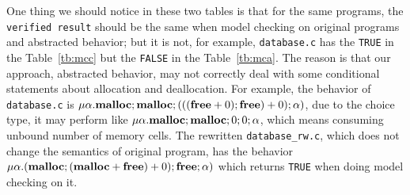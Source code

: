 One thing we should notice in these two tables is that for the same
programs, the \texttt{verified result} should be the same when model
checking on original programs and abstracted behavior; but it is not,
for example, \texttt{database.c} has the \texttt{TRUE} in the
Table~\ref{tb:mcc} but the \texttt{FALSE} in the
Table~\ref{tb:mca}. The reason is that our approach, abstracted
behavior, may not correctly deal with some conditional statements
about allocation and deallocation. For example, the behavior of
\texttt{database.c} is $\mu\alpha.\mathbf{malloc};\mathbf{malloc};(((\mathbf{free} + 0);\mathbf{free})
+ 0);\alpha)$, due to the choice type, it may perform like
$\mu\alpha.\mathbf{malloc};\mathbf{malloc};0;0;\alpha$, which means consuming unbound
number of memory cells. The rewritten \texttt{database\_rw.c}, which
does not change the semantics of original program, has the behavior
$\mu\alpha.(\mathbf{malloc};(\mathbf{malloc} + \mathbf{free}) + 0);\mathbf{free};\alpha)$ which
returns \texttt{TRUE} when doing model checking on it.



